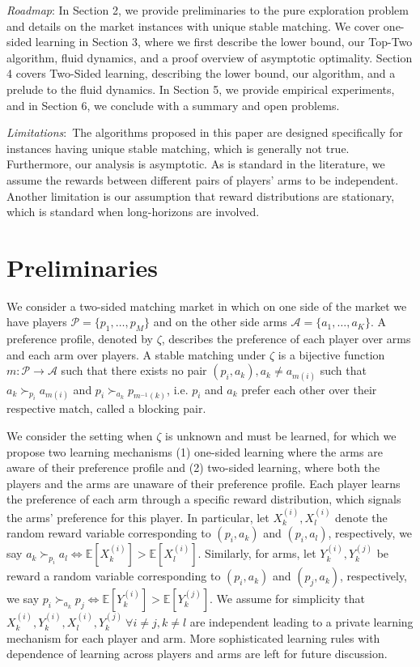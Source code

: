 \documentclass{article}
\newcommand{\E}{\mathbb{E}}
\begin{document}
\textit{Roadmap}: In Section 2, we provide preliminaries to the pure exploration problem and details on the market instances with unique stable matching. We cover one-sided learning in Section 3, where we first describe the lower bound, our Top-Two algorithm, fluid dynamics, and a proof overview of asymptotic optimality. Section 4 covers Two-Sided learning, describing the lower bound, our algorithm, and a prelude to the fluid dynamics. In Section 5, we provide empirical experiments, and in Section 6, we conclude with a summary and open problems.

\textit{Limitations}:~The algorithms proposed in this paper are designed specifically for instances having unique stable matching, which is generally not true. Furthermore, our analysis is asymptotic. As is standard in the literature, we assume the rewards between different pairs of players' arms to be independent. Another limitation is our assumption that reward distributions are stationary, which is standard when long-horizons are involved. 

\section{Preliminaries}\label{sec:preliminaries}

We consider a two-sided matching market in which on one side of the market we have players $\mathcal{P}=\{p_1,\ldots,p_M\}$ and on the other side arms $\mathcal{A}=\{a_1,\ldots,a_K\}$.
A preference profile, denoted by $\zeta$, describes the preference of each player over arms and each arm over players. A stable matching under $\zeta$ is a bijective function $m:\mathcal{P}\to\mathcal{A}$ such that there exists no pair $(p_i,a_k), a_k\neq a_{m(i)}$ such that $a_k\succ_{p_i}a_{m(i)}$ and $p_i\succ_{a_k}p_{m^{-1}(k)}$, i.e. $p_i$ and $a_k$ prefer each other over their respective match, called a blocking pair.

We consider the setting when $\zeta$ is unknown and must be learned, for which we propose two learning mechanisms (1) one-sided learning where the arms are aware of their preference profile and (2) two-sided learning, where both the players and the arms are unaware of their preference profile. Each player learns the preference of each arm through a specific reward distribution, which signals the arms' preference for this player. In particular, let $X^{(i)}_k,X^{(i)}_l$ denote the random reward variable corresponding to $(p_i,a_k)$ and $(p_i,a_{l})$, respectively, we say $a_k\succ_{p_{i}}a_l\iff \E[X^{(i)}_k]>\E[X^{(i)}_l]$. Similarly, for arms, let $Y^{(i)}_k,Y^{(j)}_k$ be reward a random variable corresponding to $(p_i,a_k)$ and $(p_j,a_{k})$, respectively, we say $p_i\succ_{a_k}p_j\iff \E[Y^{(i)}_k]>\E[Y^{(j)}_k]$. We assume for simplicity that $X^{(i)}_k,Y^{(i)}_k,X^{(i)}_{l},Y^{(j)}_{k}\ \forall i\neq j, k\neq l$ are independent leading to a private learning mechanism for each player and arm. More sophisticated learning rules with dependence of learning across players and arms are left for future discussion. 
\end{document}
